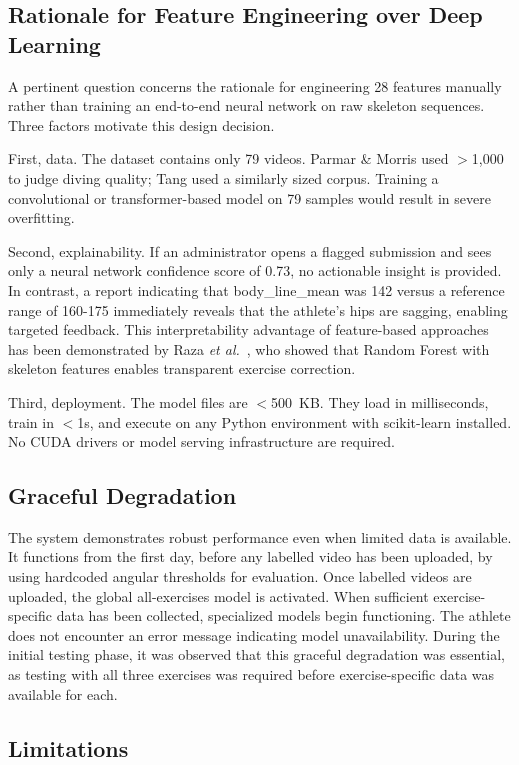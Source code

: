 \documentclass[conference]{IEEEtran}
\begin{document}
\subsection{Rationale for Feature Engineering over Deep Learning}
A pertinent question concerns the rationale for engineering 28 features manually rather than training an end-to-end neural network on raw skeleton sequences. Three factors motivate this design decision.

First, data. The dataset contains only 79 videos. Parmar \& Morris used $>$1,000 to judge diving quality; Tang used a similarly sized corpus. Training a convolutional or transformer-based model on 79 samples would result in severe overfitting.

Second, explainability. If an administrator opens a flagged submission and sees only a neural network confidence score of 0.73, no actionable insight is provided. In contrast, a report indicating that body\_line\_mean was 142 versus a reference range of 160-175 immediately reveals that the athlete's hips are sagging, enabling targeted feedback. This interpretability advantage of feature-based approaches has been demonstrated by Raza \textit{et al.}~\cite{raza2023}, who showed that Random Forest with skeleton features enables transparent exercise correction.

Third, deployment. The model files are $<$500~KB. They load in milliseconds, train in $<$1s, and execute on any Python environment with scikit-learn installed. No CUDA drivers or model serving infrastructure are required.

\subsection{Graceful Degradation}
The system demonstrates robust performance even when limited data is available. It functions from the first day, before any labelled video has been uploaded, by using hardcoded angular thresholds for evaluation. Once labelled videos are uploaded, the global all-exercises model is activated. When sufficient exercise-specific data has been collected, specialized models begin functioning. The athlete does not encounter an error message indicating model unavailability. During the initial testing phase, it was observed that this graceful degradation was essential, as testing with all three exercises was required before exercise-specific data was available for each.

\subsection{Limitations}
\end{document}
